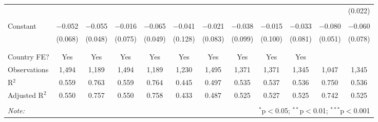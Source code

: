 \begin{table}[!htbp]
\begin{tabular}{@{\extracolsep{5pt}}lccccccccccc}
  &  &  &  &  &  &  &  &  &  &  & (0.022) \\ 
  & & & & & & & & & & & \\ 
 Constant & $-$0.052 & $-$0.055 & $-$0.016 & $-$0.065 & $-$0.041 & $-$0.021 & $-$0.038 & $-$0.015 & $-$0.033 & $-$0.080 & $-$0.060 \\ 
  & (0.068) & (0.048) & (0.075) & (0.049) & (0.128) & (0.083) & (0.099) & (0.100) & (0.081) & (0.051) & (0.078) \\ 
  & & & & & & & & & & & \\ 
\hline \\[-1.8ex] 
Country FE? & Yes & Yes & Yes & Yes & Yes & Yes & Yes & Yes & Yes &  &  \\ 
Observations & 1,494 & 1,189 & 1,494 & 1,189 & 1,230 & 1,495 & 1,371 & 1,371 & 1,345 & 1,047 & 1,345 \\ 
R$^{2}$ & 0.559 & 0.763 & 0.559 & 0.764 & 0.445 & 0.497 & 0.535 & 0.537 & 0.536 & 0.750 & 0.536 \\ 
Adjusted R$^{2}$ & 0.550 & 0.757 & 0.550 & 0.758 & 0.433 & 0.487 & 0.525 & 0.527 & 0.525 & 0.742 & 0.525 \\ 
\hline 
\hline \\[-1.8ex] 
\textit{Note:}  & \multicolumn{11}{r}{$^{*}$p$<$0.05; $^{**}$p$<$0.01; $^{***}$p$<$0.001} \\ 
\end{tabular} 
\end{table} 

